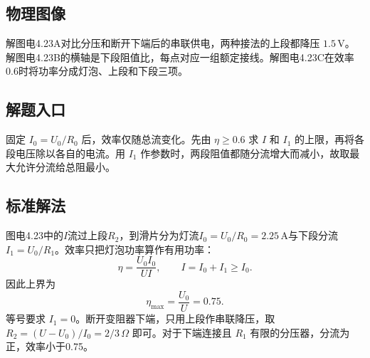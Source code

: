 \documentclass[UTF8,fontset=fandol,a4paper,11pt]{ctexart}
\begin{document}
\subsection*{物理图像}

解图电4.23A对比分压和断开下端后的串联供电，两种接法的上段都降压 $1.5\,\mathrm V$。解图电4.23B的横轴是下段阻值比，每点对应一组额定接线。解图电4.23C在效率0.6时将功率分成灯泡、上段和下段三项。



\subsection*{解题入口}

固定 $I_0=U_0/R_0$ 后，效率仅随总流变化。先由 $\eta\ge0.6$ 求 $I$ 和 $I_1$ 的上限，再将各段电压除以各自的电流。用 $I_1$ 作参数时，两段阻值都随分流增大而减小，故取最大允许分流给总阻最小。


\subsection*{标准解法}

图电4.23中的$I$流过上段$R_2$，到滑片分为灯流$I_0=U_0/R_0=2.25\,\mathrm A$与下段分流$I_1=U_0/R_1$。效率只把灯泡功率算作有用功率：
\[
\eta=\frac{U_0I_0}{UI},\qquad I=I_0+I_1\ge I_0.
\]
因此上界为
\[
\boxed{\eta_{\max}=\frac{U_0}U=0.75}.
\]
等号要求 $I_1=0$。断开变阻器下端，只用上段作串联降压，取 $R_2=(U-U_0)/I_0=2/3\,\Omega$ 即可。对于下端连接且 $R_1$ 有限的分压器，分流为正，效率小于0.75。
\end{document}
